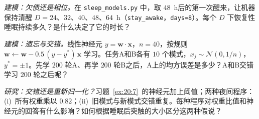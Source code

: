 \begin{exercise}[\lvlB]
\label{ex:20:6}
\emph{建模：欠债还是相位。}在 \texttt{sleep\_models.py} 中，取 $48$~h后的第一次醒来，让机器保持清醒 $D=24$、$32$、$40$、$48$、$64$~h（\texttt{stay\_awake}，\texttt{days=8}）。每个 $D$ 下恢复性睡眠持续多久？是什么决定了它的时长？
\end{exercise}

\begin{exercise}[\lvlB]
\label{ex:20:7}
\emph{建模：遗忘与交错。}线性神经元 $y=\mathbf w\cdot\mathbf x$，$n=40$，按规则 $\mathbf w\leftarrow\mathbf w-0.5\,(y-y^*)\,\mathbf x$ 学习。任务A和B各有 $10$ 个模式，$x_j\sim\mathcal N(0,1/n)$，$y^*=\pm1$。先学 $200$ 轮A、再学 $200$ 轮B之后，A上的均方误差是多少？A和B交错学习 $200$ 轮之后呢？
\end{exercise}

\begin{exercise}[\lvlC]
\label{ex:20:8}
\emph{研究：交错还是重新归一化？}习题~\ref{ex:20:7}~的神经元加上阈值；两种夜间程序：(i)~所有权重乘以 $0.82$；(ii)~旧模式与新模式交错重复。每种程序对权重比值和神经元的回答有什么影响？如何根据睡眠后突触的大小区分这两种假说？
\end{exercise}
